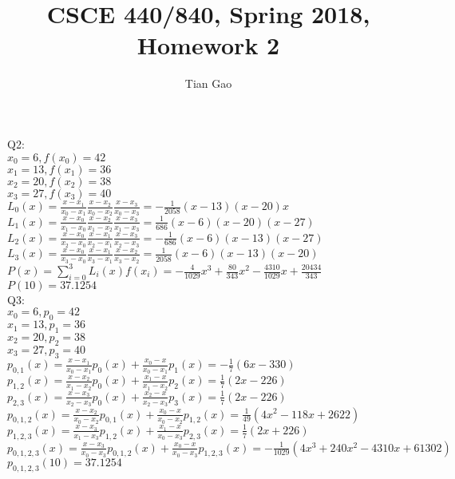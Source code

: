 \documentclass[a4paper]{article}
\title{CSCE 440/840, Spring 2018, Homework 2}
\author{Tian Gao}
\begin{document}
\maketitle


Q2:\\
$x_0 = 6, f(x_0)=42$\\
$x_1 = 13, f(x_1)=36$\\
$x_2 = 20, f(x_2)=38$\\
$x_3 = 27, f(x_3)=40$\\
$L_0(x)=\frac{x-x_1}{x_0-x_1} \frac{x-x_2}{x_0-x_2} \frac{x-x_3}{x_0-x_3}=-\frac{1}{2058}(x-13)(x-20)x$\\
$L_1(x)=\frac{x-x_0}{x_1-x_0} \frac{x-x_2}{x_1-x_2} \frac{x-x_3}{x_1-x_3}=\frac{1}{686}(x-6)(x-20)(x-27)$\\
$L_2(x)=\frac{x-x_0}{x_2-x_0} \frac{x-x_1}{x_2-x_1} \frac{x-x_3}{x_2-x_3}=-\frac{1}{686}(x-6)(x-13)(x-27)$\\
$L_3(x)=\frac{x-x_0}{x_3-x_0} \frac{x-x_1}{x_3-x_1} \frac{x-x_2}{x_3-x_2}=\frac{1}{2058}(x-6)(x-13)(x-20)$\\
$P(x)=\sum\limits_{i=0}^{3}L_i(x)f(x_i)=-\frac{4}{1029}x^3+\frac{80}{343}x^2-\frac{4310}{1029}x+\frac{20434}{343}$\\
$P(10)=37.1254$\\

Q3:\\
$x_0 = 6, p_0=42$\\
$x_1 = 13, p_1=36$\\
$x_2 = 20, p_2=38$\\
$x_3 = 27, p_3=40$\\
$p_{0,1}(x)=\frac{x-x_1}{x_0-x_1}p_0(x)+\frac{x_0-x}{x_0-x_1}p_1(x)=-\frac{1}{7}(6x-330)$\\
$p_{1,2}(x)=\frac{x-x_2}{x_1-x_2}p_0(x)+\frac{x_1-x}{x_1-x_2}p_2(x)=\frac{1}{7}(2x-226)$\\
$p_{2,3}(x)=\frac{x-x_3}{x_2-x_3}p_0(x)+\frac{x_2-x}{x_2-x_3}p_3(x)=\frac{1}{7}(2x-226)$\\
$p_{0,1,2}(x)=\frac{x-x_2}{x_0-x_2}p_{0,1}(x)+\frac{x_0-x}{x_0-x_2}p_{1,2}(x)=\frac{1}{49}(4x^2-118x+2622)$\\
$p_{1,2,3}(x)=\frac{x-x_3}{x_1-x_3}p_{1,2}(x)+\frac{x_1-x}{x_0-x_3}p_{2,3}(x)=\frac{1}{7}(2x+226)$\\
$p_{0,1,2,3}(x)=\frac{x-x_3}{x_0-x_3}p_{0, 1,2}(x)+\frac{x_0-x}{x_0-x_3}p_{1, 2,3}(x)=-\frac{1}{1029}(4x^3+240x^2-4310x+61302)$\\
$p_{0,1,2,3}(10)=37.1254$\\
\end{document}
